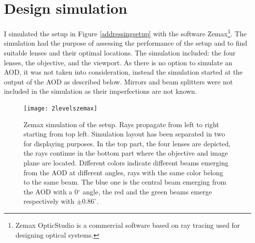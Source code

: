\section{Design simulation}
I simulated the setup in Figure \ref{addressingsetup} with the software Zemax\footnote{Zemax OpticStudio is a commercial software based on ray tracing used for designing optical systems.}. The simulation had the purpose of assessing the performance of the setup and to find suitable lenses and their optimal locations. The simulation included: the four lenses, the objective, and the viewport. As there is no option to simulate an AOD, it was not taken into consideration, instead the simulation started at the output of the AOD as described below. Mirrors and beam splitters were not included in the simulation as their imperfections are not known.
\begin{figure}[H]
\centering
\texttt{[image: 2levelszemax]}
\caption{Zemax simulation of the setup. Rays propagate from left to right starting from top left. Simulation layout has been separated in two for displaying purposes. In the top part, the four lenses are depicted, the rays continue in the bottom part where the objective and image plane are located. Different colors indicate different beams emerging from the AOD at different angles, rays with the same color belong to the same beam. The blue one is the central beam emerging from the AOD with a 0$^\circ$ angle, the red and the green beams emerge respectively with $\pm0.86^\circ$.}
\label{zemaxview}
\end{figure}
